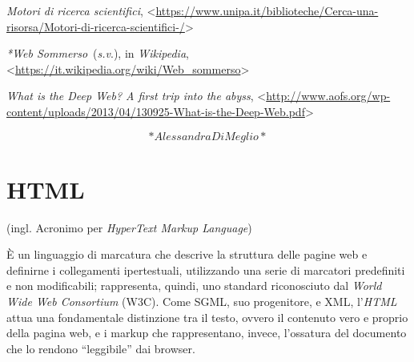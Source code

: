 \documentclass[
  b5paper,
  twoside,
  11pt,
  chapterprefix=false,
  bibliography=totocnumbered,
  parskip=0]{scrbook}
\begin{document}
\emph{Motori di ricerca scientifici},
\textless{}{\url{https://www.unipa.it/biblioteche/Cerca-una-risorsa/Motori-di-ricerca-scientifici-/}\textgreater{}}

\emph{*Web Sommerso}~(\emph{s.v}.), in \emph{Wikipedia},
\textless{}\href{https://it.wikipedia.org/wiki/Web_sommerso}{{https://it.wikipedia.org/wiki/Web\_sommerso}}\textgreater{}

\emph{What is the Deep Web? A first trip into the abyss},
\textless{}{\url{http://www.aofs.org/wp-content/uploads/2013/04/130925-What-is-the-Deep-Web.pdf}\textgreater{}}

\[*Alessandra Di Meglio*\]

\hypertarget{html}{%
\chapter{HTML}\label{html}}

(ingl. Acronimo per \emph{HyperText Markup Language})

È un linguaggio di marcatura che descrive la struttura delle pagine web
e definirne i collegamenti ipertestuali, utilizzando una serie di
marcatori predefiniti e non modificabili; rappresenta, quindi, uno
standard riconosciuto dal \emph{World Wide Web Consortium} (W3C). Come SGML,
suo progenitore, e XML, l'\emph{HTML} attua una fondamentale distinzione tra
il testo, ovvero il contenuto vero e proprio della pagina web, e i
markup che rappresentano, invece, l'ossatura del documento che lo
rendono \enquote{leggibile} dai browser.
\end{document}
